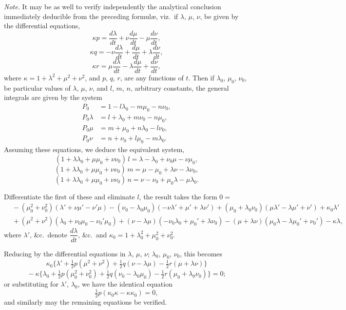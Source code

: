 \documentclass[11pt]{article}
\begin{document}
\medskip
\noindent\textit{Note.} It may be as well to verify independently the analytical conclusion immediately deducible from the preceding formul\ae, viz.\ if $\lambda$, $\mu$, $\nu$, be given by the differential equations,
\[
\kappa p = \frac{d\lambda}{dt} + \nu\frac{d\mu}{dt} - \mu\frac{d\nu}{dt},
\]
\[
\kappa q = -\nu\frac{d\lambda}{dt} + \frac{d\mu}{dt} + \lambda\frac{d\nu}{dt},
\]
\[
\kappa r = \mu\frac{d\lambda}{dt} - \lambda\frac{d\mu}{dt} + \frac{d\nu}{dt},
\]
where $\kappa = 1 + \lambda^2 + \mu^2 + \nu^2$, and $p$, $q$, $r$, are any functions of $t$. Then if $\lambda_0$, $\mu_0$, $\nu_0$, be particular values of $\lambda$, $\mu$, $\nu$, and $l$, $m$, $n$, arbitrary constants, the general integrals are given by the system
\[
\begin{aligned}
P_0       &= 1 - l\lambda_0 - m\mu_0 - n\nu_0, \\
P_0 \lambda &= l + \lambda_0 + m\nu_0 - n\mu_0, \\
P_0 \mu    &= m + \mu_0 + n\lambda_0 - l\nu_0, \\
P_0 \nu    &= n + \nu_0 + l\mu_0 - m\lambda_0.
\end{aligned}
\]
Assuming these equations, we deduce the equivalent system,
\[
(1 + \lambda\lambda_0 + \mu\mu_0 + \nu\nu_0)\,l = \lambda - \lambda_0 + \nu_0\mu - \nu\mu_0,
\]
\[
(1 + \lambda\lambda_0 + \mu\mu_0 + \nu\nu_0)\,m = \mu - \mu_0 + \lambda\nu - \lambda\nu_0,
\]
\[
(1 + \lambda\lambda_0 + \mu\mu_0 + \nu\nu_0)\,n = \nu - \nu_0 + \mu_0\lambda - \mu\lambda_0.
\]

Differentiate the first of these and eliminate $l$, the result takes the form $0 =$
\[
\begin{aligned}
&{}-(\mu_0^2 + \nu_0^2)(\lambda' + \nu\mu' - \nu'\mu) - (\nu_0 - \lambda_0\mu_0)(-\nu\lambda' + \mu' + \lambda\nu') + (\mu_0 + \lambda_0\nu_0)(\mu\lambda' - \lambda\mu' + \nu') + \kappa_0\lambda' \\
&{}+ (\mu^2 + \nu^2)(\lambda_0 + \nu_0\mu_0 - \nu_0'\mu_0) + (\nu - \lambda\mu)(-\nu_0\lambda_0 + \mu_0' + \lambda\nu_0) - (\mu + \lambda\nu)(\mu_0\lambda - \lambda\mu_0' + \nu_0') - \kappa\lambda,
\end{aligned}
\]
where $\lambda'$, \&c.\ denote $\dfrac{d\lambda}{dt}$, \&c.\ and $\kappa_0 = 1 + \lambda_0^2 + \mu_0^2 + \nu_0^2$.

Reducing by the differential equations in $\lambda$, $\mu$, $\nu$; $\lambda_0$, $\mu_0$, $\nu_0$, this becomes
\[
\kappa_0\{\lambda' + \tfrac12 p(\mu^2 + \nu^2) + \tfrac12 q(\nu - \lambda\mu) - \tfrac12 r(\mu + \lambda\nu)\}
\]
\[
{} - \kappa\{\lambda_0 + \tfrac12 p(\mu_0^2 + \nu_0^2) + \tfrac12 q(\nu_0 - \lambda_0\mu_0) - \tfrac12 r(\mu_0 + \lambda_0\nu_0)\} = 0;
\]
or substituting for $\lambda'$, $\lambda_0$, we have the identical equation
\[
\tfrac12 p(\kappa_0\kappa - \kappa\kappa_0) = 0,
\]
and similarly may the remaining equations be verified.
\end{document}
